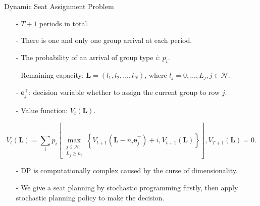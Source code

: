   \begin{frame}{Dynamic Seat Assignment Problem}
    \centering
    \small
    \begin{itemize}
    \item[-] $T+1$ periods in total.
    \item[-] There is one and only one group arrival at each period. 
    \item[-] The probability of an arrival of group type $i$: $p_i$.  
    \item[-] Remaining capacity: $\mathbf{L} = (l_1, l_2, \ldots, l_{N})$, where $l_j =0,\ldots, L_j, j\in \mathcal{N}$.
    \item[-] $\mathbf{e}_j^{\intercal}$: decision variable whether to assign the current group to row $j$.
    \item[-] Value function: $V_{t}(\mathbf{L})$.
    \end{itemize}

    $$V_{t}(\mathbf{L}) = \sum_{i} p_i \left[\max_{\substack{j \in \mathcal{N}: \\ L_j \geqslant {n}_{i}}}\left\{V_{t+1}\left(\mathbf{L}- n_{i}\mathbf{e}_j^{\intercal} \right)+ i, V_{t+1}(\mathbf{L})\right\}\right], V_{T+1}(\mathbf{L}) = 0.$$
    \small
    \begin{itemize}
      \item[-] DP is computationally complex caused by the curse of dimensionality.
      \item[-] We give a seat planning by stochastic programming firstly, then apply stochastic planning policy to make the decision.
    \end{itemize}
\end{frame}